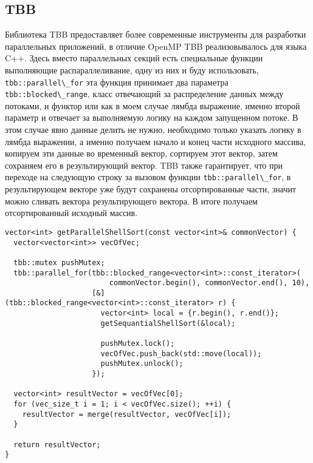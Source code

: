 \documentclass{report}
\begin{document}
\subsection*{TBB}
\par Библиотека TBB предоставляет более современные инструменты для разработки параллельных приложений, в отличие OpenMP TBB реализовывалось для языка C++. Здесь вместо параллельных секций есть специальные функции выполняющие распараллеливание, одну из них и буду использовать,  \verb|tbb::parallel\_for| эта функция принимает два параметра  \verb|tbb::blocked\_range|, класс отвечающий за распределение данных между потоками, и функтор или как в моем случае лямбда выражение, именно второй параметр и отвечает за выполняемую логику на каждом запущенном потоке. В этом случае явно данные делить не нужно, необходимо только указать логику в лямбда выражении, а именно получаем начало и конец части исходного массива, копируем эти данные во временный вектор, сортируем этот вектор, затем сохраняем его в результирующий вектор. TBB также гарантирует, что при переходе на следующую строку за вызовом функции  \verb|tbb::parallel\_for|, в результирующем векторе уже будут сохранены отсортированные части, значит можно сливать вектора результирующего вектора. В итоге получаем отсортированный исходный массив.

\begin{lstlisting}
vector<int> getParallelShellSort(const vector<int>& commonVector) {
  vector<vector<int>> vecOfVec;

  tbb::mutex pushMutex;
  tbb::parallel_for(tbb::blocked_range<vector<int>::const_iterator>(
                        commonVector.begin(), commonVector.end(), 10),
                    [&](tbb::blocked_range<vector<int>::const_iterator> r) {
                      vector<int> local = {r.begin(), r.end()};
                      getSequantialShellSort(&local);

                      pushMutex.lock();
                      vecOfVec.push_back(std::move(local));
                      pushMutex.unlock();
                    });

  vector<int> resultVector = vecOfVec[0];
  for (vec_size_t i = 1; i < vecOfVec.size(); ++i) {
    resultVector = merge(resultVector, vecOfVec[i]);
  }

  return resultVector;
}
\end{lstlisting}

\newpage
\end{document}
